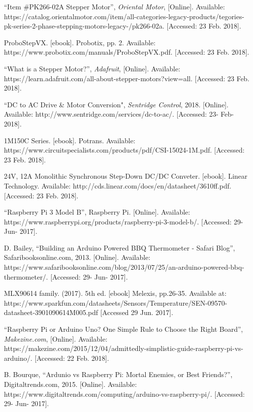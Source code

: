 \documentclass[11pt]{article}
\begin{document}
\begin{thebibliography}{0}
``Item \#PK266-02A Stepper Motor”, \textit{Oriental Motor}, [Online]. Available: https://catalog.orientalmotor.com/item/all-categories-legacy-products/tegories-pk-series-2-phase-stepping-motors-legacy-/pk266-02a. [Accessed: 23 Feb. 2018].

ProboStepVX. [ebook]. Probotix, pp. 2. Available: https://www.probotix.com/manuals/ProboStepVX.pdf. [Accessed: 23 Feb. 2018].

``What is a Stepper Motor?”, \textit{Adafruit}, [Online]. Available: https://learn.adafruit.com/all-about-stepper-motors?view=all. [Accessed: 23 Feb. 2018].

``DC to AC Drive \& Motor Conversion", \textit{Sentridge Control}, 2018. [Online]. Available:  http://www.sentridge.com/services/dc-to-ac/. [Accessed: 23- Feb- 2018].

1M150C Series. [ebook]. Potrans. Available: https://www.circuitspecialists.com/products/pdf/CSI-15024-1M.pdf. [Accessed: 23 Feb. 2018].

24V, 12A Monolithic Synchronous Step-Down DC/DC Conveter. [ebook]. Linear Technology. Available: http://cds.linear.com/docs/en/datasheet/3610ff.pdf. [Accessed: 23 Feb. 2018].

``Raspberry Pi 3 Model B'', Raspberry Pi. [Online]. Available: https://www.raspberrypi.org/products/raspberry-pi-3-model-b/. [Accessed: 29- Jun- 2017].

D. Bailey, ``Building an Arduino Powered BBQ Thermometer - Safari Blog'', Safaribooksonline.com, 2013. [Online]. Available: https://www.safaribooksonline.com/blog/2013/07/25/an-arduino-powered-bbq-thermometer/. [Accessed: 29- Jun- 2017].

MLX90614 family. (2017). 5th ed. [ebook] Melexis, pp.26-35. Available at: https://www.sparkfun.com/datasheets/Sensors/Temperature/SEN-09570-datasheet-3901090614M005.pdf [Accessed 29 Jun. 2017].

``Raspberry Pi or Arduino Uno? One Simple Rule to Choose the Right Board”, \textit{Makezine.com}, [Online]. Available:  https://makezine.com/2015/12/04/admittedly-simplistic-guide-raspberry-pi-vs-arduino/. [Accessed: 22 Feb. 2018].

B. Bourque, ``Ardunio vs Raspberry Pi: Mortal Enemies, or Best Friends?'', Digitaltrends.com, 2015. [Online]. Available: https://www.digitaltrends.com/computing/arduino-vs-raspberry-pi/. [Accessed: 29- Jun- 2017].


\end{thebibliography}
\end{document}
